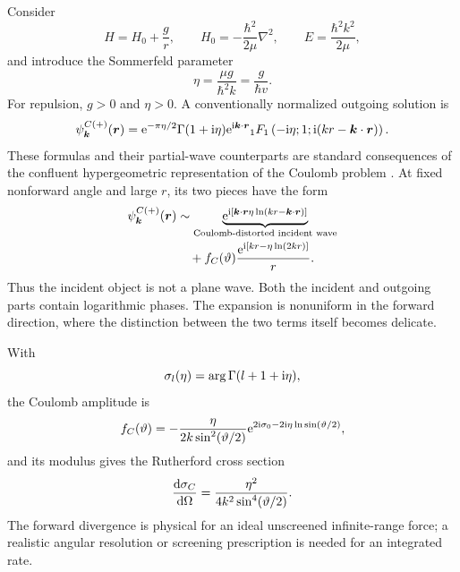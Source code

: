 Consider
\begin{equation}
  H=H_0+\frac{g}{r},
  \qquad
  H_0=-\frac{\hbar^2}{2\mu}\nabla^2,
  \qquad
  E=\frac{\hbar^2k^2}{2\mu},
  \label{eq:coulomb-hamiltonian-scattering}
\end{equation}
and introduce the Sommerfeld parameter
\begin{equation}
  \eta=\frac{\mu g}{\hbar^2 k}
  =\frac{g}{\hbar v}.
  \label{eq:sommerfeld-parameter}
\end{equation}
For repulsion, $g>0$ and $\eta>0$.  A conventionally normalized outgoing
solution is
\begin{equation}
  \psi_{\bm k}^{C(+)}(\bm r)
  =\mathrm{e}^{-\pi\eta/2}\Gamma(1+\mathrm{i}\eta)
  \mathrm{e}^{\mathrm{i}\bm k\cdot\bm r}
  {}_1F_1\left(-\mathrm{i}\eta;1;
  \mathrm{i}(kr-\bm k\cdot\bm r)\right).
  \label{eq:coulomb-hypergeometric-wave}
\end{equation}
These formulas and their partial-wave counterparts are standard consequences
of the confluent hypergeometric representation of the Coulomb problem
\cite{Taylor:1972,PerelomovZeldovich:1998}.
At fixed nonforward angle and large $r$, its two pieces have the form
\begin{align}
  \psi_{\bm k}^{C(+)}(\bm r)
  &\sim
  \underbrace{\mathrm{e}^{\mathrm{i}\left[
  \bm k\cdot\bm r
  \eta\ln(kr-\bm k\cdot\bm r)\right]}}
  _{\text{Coulomb-distorted incident wave}}
  \notag\\
  &\quad+
  f_C(\vartheta)
  \frac{\mathrm{e}^{\mathrm{i}\left[
  kr-\eta\ln(2kr)\right]}}{r}.
  \label{eq:coulomb-full-asymptotic}
\end{align}
Thus the incident object is not a plane wave.  Both the incident and outgoing
parts contain logarithmic phases.  The expansion is nonuniform in the forward
direction, where the distinction between the two terms itself becomes
delicate.

With
\begin{equation}
  \sigma_l(\eta)=\arg\Gamma(l+1+\mathrm{i}\eta),
  \label{eq:coulomb-phase-shift}
\end{equation}
the Coulomb amplitude is
\begin{equation}
  f_C(\vartheta)
  =-\frac{\eta}{2k\sin^2(\vartheta/2)}
  \mathrm{e}^{
  2\mathrm{i}\sigma_0
  -2\mathrm{i}\eta\ln\sin(\vartheta/2)},
  \label{eq:coulomb-amplitude}
\end{equation}
and its modulus gives the Rutherford cross section
\begin{equation}
  \frac{\mathrm{d}\sigma_C}{\mathrm{d}\Omega}
  =\frac{\eta^2}{4k^2\sin^4(\vartheta/2)} .
  \label{eq:rutherford-cross-section}
\end{equation}
The forward divergence is physical for an ideal unscreened infinite-range
force; a realistic angular resolution or screening prescription is needed for
an integrated rate.


